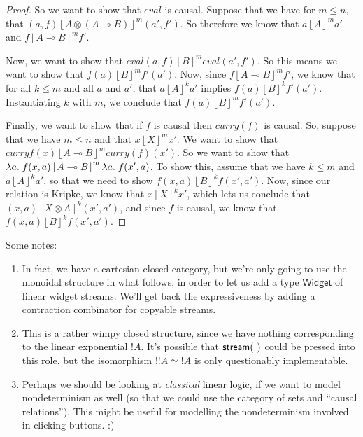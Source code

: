 \documentclass{article}
\newcommand{\Approx}[2][n]{\left\lfloor{#2}\right\rfloor^{#1}}
\newcommand{\lolli}{\multimap}
\begin{document}
\begin{proof}
  So we want to show that $\mathit{eval}$ is causal. Suppose that we have for $m \leq n$, 
  that $(a, f) \Approx[m]{A \otimes (A \lolli B)} (a', f')$. So therefore we know that 
  $a \Approx[m]{A} a'$ and $f \Approx[m]{A \lolli B} f'$. 

  Now, we want to show that $\mathit{eval}(a, f) \Approx[m]{B}
  \mathit{eval}(a', f')$. So this means we want to show that $f(a) \Approx[m]{B} f'(a')$. 
  Now, since $f \Approx[m]{A \lolli B} f'$, we know that for all $k \leq m$ and all 
  $a$ and $a'$, that $a \Approx[k]{A} a'$ implies $f(a) \Approx[k]{B} f'(a')$. Instantiating
  $k$ with $m$, we conclude that $f(a) \Approx[m]{B} f'(a')$. 

  Finally, we want to show that if $f$ is causal then
  $\mathit{curry}(f)$ is causal. So, suppose that we have $m \leq n$ and that 
  $x \Approx[m]{X} x'$. We want to show that $\mathit{curry}{f}(x) \Approx[m]{A \lolli B} \mathit{curry}(f)(x')$. 
  So we want to show that $\semfun{a}{f(x, a)} \Approx[m]{A \lolli B} \semfun{a}{f(x',a)}$. 
  To show this, assume that we have $k \leq m$ and $a \Approx[k]{A} a'$, so that we need to 
  show $f(x, a) \Approx[k]{B} f(x',a')$. Now, since our relation is Kripke, we know that 
  $x \Approx[k]{X} x'$, which lets us conclude that $(x, a) \Approx[k]{X \otimes A} (x',a')$, 
  and since $f$ is causal, we know that $f(x, a) \Approx[k]{B} f(x',a')$. 
\end{proof}

Some notes: 
\begin{enumerate}
\item In fact, we have a cartesian closed category, but we're
  only going to use the monoidal structure in what follows, in order to
  let us add a type $\textsf{Widget}$ of linear widget streams. We'll get back
  the expressiveness by adding a contraction combinator for copyable streams. 

\item This is a rather wimpy closed structure, since we have nothing 
  corresponding to the linear exponential $!A$. It's possible that $\mathsf{stream}({\ })$
  could be pressed into this role, but the isomorphism $!!A \simeq !A$ is 
  only questionably implementable. 

\item Perhaps we should be looking at \emph{classical} linear logic, if 
  we want to model nondeterminism as well (so that we could use the category
  of sets and ``causal relations''). This might be useful for modelling the
  nondeterminism involved in clicking buttons. :)
\end{enumerate}
\end{document}
